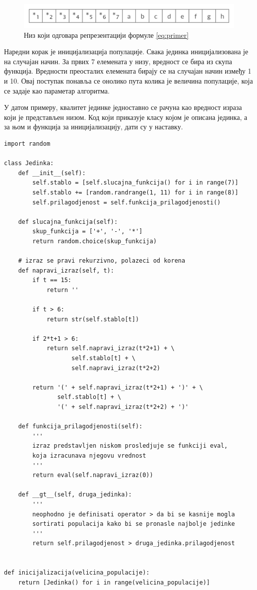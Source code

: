 \documentclass[a4paper]{article}
\begin{document}
\begin{figure}[ht!]
    \begin{center}
    \includegraphics[scale=0.14]{niz_primera.png}
    \end{center}
    \caption{Низ који одговара репрезентацији формуле \eqref{eq:primer}}
    \label{fig:niz}
\end{figure}
\bigskip

Наредни корак је иницијализација популације. Свака јединка иницијализована је на случајан начин. За првих 7 елемената у низу, вредност се бира из скупа функција. Вредности преосталих елемената бирају се на случајан начин између 1 и 10. Овај поступак понавља се онолико пута колика је величина популације, која се задаје као параметар алгоритма. \newline

У датом примеру, квалитет јединке једноставно се рачуна као вредност израза који је представљен низом. Код који приказује класу којом је описана јединка, а за њом и функција за иницијализацију, дати су у наставку. \newline

\smallskip
\begin{lstlisting}[frame=single, label=simple]
import random

class Jedinka:
    def __init__(self):
        self.stablo = [self.slucajna_funkcija() for i in range(7)]
        self.stablo += [random.randrange(1, 11) for i in range(8)]
        self.prilagodjenost = self.funkcija_prilagodjenosti()

    def slucajna_funkcija(self):
        skup_funkcija = ['+', '-', '*']
        return random.choice(skup_funkcija)

    # izraz se pravi rekurzivno, polazeci od korena
    def napravi_izraz(self, t):
        if t == 15:
            return ''

        if t > 6:
            return str(self.stablo[t])

        if 2*t+1 > 6:
            return self.napravi_izraz(t*2+1) + \
                   self.stablo[t] + \
                   self.napravi_izraz(t*2+2)

        return '(' + self.napravi_izraz(t*2+1) + ')' + \
               self.stablo[t] + \
               '(' + self.napravi_izraz(t*2+2) + ')'

    def funkcija_prilagodjenosti(self):
        '''
        izraz predstavljen niskom prosledjuje se funkciji eval,
        koja izracunava njegovu vrednost
        '''
        return eval(self.napravi_izraz(0))

    def __gt__(self, druga_jedinka):
        '''
        neophodno je definisati operator > da bi se kasnije mogla
        sortirati populacija kako bi se pronasle najbolje jedinke
        '''
        return self.prilagodjenost > druga_jedinka.prilagodjenost
        
    
def inicijalizacija(velicina_populacije):
    return [Jedinka() for i in range(velicina_populacije)]
\end{lstlisting}
\end{document}
